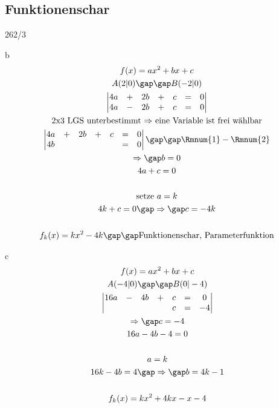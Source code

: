 \subsection{Funktionenschar}
\begin{exercise}{262/3}
  \item [b]
  \begin{gather*}
    f(x) = ax^2 + bx + c \\
    A(2|0) \gap\gap B(-2|0) \\
    \begin{vmatrix}
      4a & + & 2b & + & c & = & 0 \\
      4a & - & 2b & + & c & = & 0
    \end{vmatrix} \\
    \text{2x3 LGS unterbestimmt $\Rightarrow$ eine Variable ist frei wählbar} \\
    \begin{vmatrix}
      4a & + & 2b & + & c & = & 0 \\
      4b &&&&& = & 0
    \end{vmatrix}
    \gap\gap \Rmnum{1} - \Rmnum{2} \\
    \Rightarrow\gap b = 0 \\
    4a + c = 0 \\\\
    \text{setze } a = k \\
    4k + c = 0 \gap\Rightarrow\gap c = -4k \\\\
    f_k(x) = kx^2 - 4k \gap\gap \text{Funktionenschar, Parameterfunktion}
  \end{gather*}
  \item [c]
  \begin{gather*}
    f(x) = ax^2 + bx + c \\
    A(-4|0) \gap\gap B(0|-4) \\
    \begin{vmatrix}
      16a & - & 4b & + & c & = & 0 \\
      &&&& c & = & -4
    \end{vmatrix} \\
    \Rightarrow\gap c = -4 \\
    16a - 4b - 4 = 0 \\\\
    a = k \\
    16k - 4b = 4 \gap\Rightarrow\gap b = 4k - 1 \\\\
    f_k(x) = kx^2 + 4kx - x - 4
  \end{gather*}
\end{exercise}
